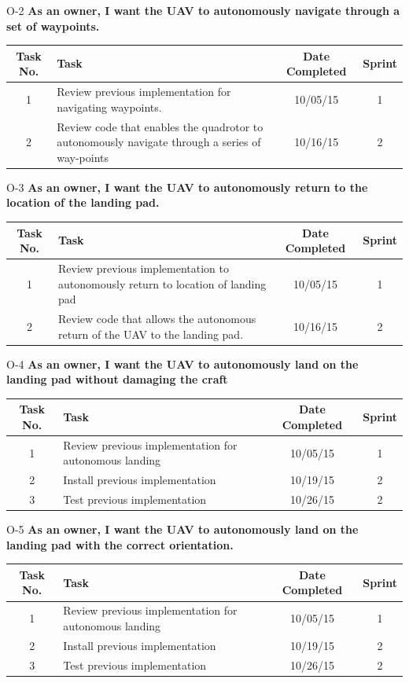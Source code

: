 \documentclass[11pt]{beamer}
\begin{document}
\begin{frame}{O-2}
\textbf{As an owner, I want the UAV to autonomously navigate through a set of waypoints.}
\begin{tabular}{| c | >{\raggedright}m{4cm} | c | c |}\hline
Task No. & Task & Date Completed & Sprint\\\hline
1 & Review previous implementation for navigating waypoints. & 10/05/15 & 1 \\\hline
2 & Review code that enables the quadrotor to autonomously navigate through a series of way-points & 10/16/15 & 2 \\\hline
\end{tabular}
\end{frame}


\begin{frame}{O-3}
\textbf{As an owner, I want the UAV to autonomously return to the location of the landing pad.}
\begin{tabular}{| c | >{\raggedright}m{4cm} | c | c |}\hline
Task No. & Task & Date Completed & Sprint\\\hline
1 & Review previous implementation to autonomously return to location of landing pad & 10/05/15 & 1 \\\hline
2 & Review code that allows the autonomous return of the UAV to the landing pad. & 10/16/15 & 2 \\\hline

\end{tabular}
\end{frame}


\begin{frame}{O-4}
\textbf{As an owner, I want the UAV to autonomously land on the landing pad without damaging the craft}
\begin{tabular}{| c | >{\raggedright}m{4cm} | c | c |}\hline
Task No. & Task & Date Completed & Sprint\\\hline
1 & Review previous implementation for autonomous landing & 10/05/15 & 1 \\\hline
2 & Install previous implementation & 10/19/15 & 2 \\\hline
3 & Test previous implementation & 10/26/15 & 2\\\hline

\end{tabular}
\end{frame}


\begin{frame}{O-5}
\textbf{As an owner, I want the UAV to autonomously land on the landing pad with the correct orientation.}
\begin{tabular}{| c | >{\raggedright}m{4cm} | c | c |}\hline
Task No. & Task & Date Completed & Sprint\\\hline
1 & Review previous implementation for autonomous landing & 10/05/15 & 1 \\\hline
2 & Install previous implementation & 10/19/15 & 2 \\\hline
3 & Test previous implementation & 10/26/15 & 2\\\hline
\end{tabular}
\end{frame}
\end{document}
